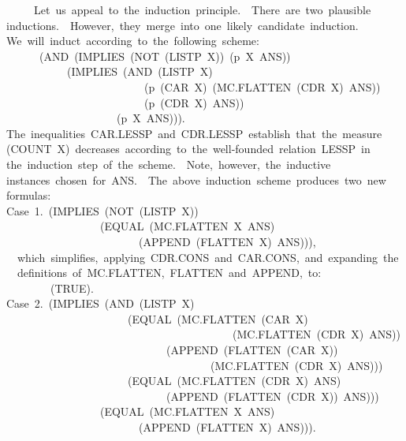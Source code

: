 \documentclass[11pt]{book}
\newenvironment{pubasis}{\begin{flushleft}\ttfamily\small}{\normalsize\rmfamily\end{flushleft}}
\begin{document}
\begin{pubasis}
~~~~~Let~us~appeal~to~the~induction~principle.~~There~are~two~plausible\\
inductions.~~However,~they~merge~into~one~likely~candidate~induction.\\
We~will~induct~according~to~the~following~scheme:\\
~~~~~~(AND~(IMPLIES~(NOT~(LISTP~X))~(p~X~ANS))\\
~~~~~~~~~~~(IMPLIES~(AND~(LISTP~X)\\
~~~~~~~~~~~~~~~~~~~~~~~~~(p~(CAR~X)~(MC.FLAT\-TEN~(CDR~X)~ANS))\\
~~~~~~~~~~~~~~~~~~~~~~~~~(p~(CDR~X)~ANS))\\
~~~~~~~~~~~~~~~~~~~~(p~X~ANS))).\\
The~inequalities~CAR.LESSP~and~CDR.LESSP~establish~that~the~measure\\
(COUNT~X)~decreases~according~to~the~well-founded~relation~LESSP~in\\
the~induction~step~of~the~scheme.~~Note,~however,~the~inductive\\
instances~chosen~for~ANS.~~The~above~induction~scheme~produces~two~new\\
formulas:\\

Case~1.~(IMPLIES~(NOT~(LISTP~X))\\
~~~~~~~~~~~~~~~~~(EQUAL~(MC.FLAT\-TEN~X~ANS)\\
~~~~~~~~~~~~~~~~~~~~~~~~(APPEND~(FLATTEN~X)~ANS))),\\

~~which~simplifies,~applying~CDR.CONS~and~CAR.CONS,~and~expanding~the\\
~~definitions~of~MC.FLAT\-TEN,~FLAT\-TEN~and~APPEND,~to:\\

~~~~~~~~(TRUE).\\

Case~2.~(IMPLIES~(AND~(LISTP~X)\\
~~~~~~~~~~~~~~~~~~~~~~(EQUAL~(MC.FLAT\-TEN~(CAR~X)\\
~~~~~~~~~~~~~~~~~~~~~~~~~~~~~~~~~~~~~~~~~(MC.FLAT\-TEN~(CDR~X)~ANS))\\
~~~~~~~~~~~~~~~~~~~~~~~~~~~~~(APPEND~(FLATTEN~(CAR~X))\\
~~~~~~~~~~~~~~~~~~~~~~~~~~~~~~~~~~~~~(MC.FLAT\-TEN~(CDR~X)~ANS)))\\
~~~~~~~~~~~~~~~~~~~~~~(EQUAL~(MC.FLAT\-TEN~(CDR~X)~ANS)\\
~~~~~~~~~~~~~~~~~~~~~~~~~~~~~(APPEND~(FLATTEN~(CDR~X))~ANS)))\\
~~~~~~~~~~~~~~~~~(EQUAL~(MC.FLAT\-TEN~X~ANS)\\
~~~~~~~~~~~~~~~~~~~~~~~~(APPEND~(FLATTEN~X)~ANS))).\\


\end{pubasis}
\end{document}
